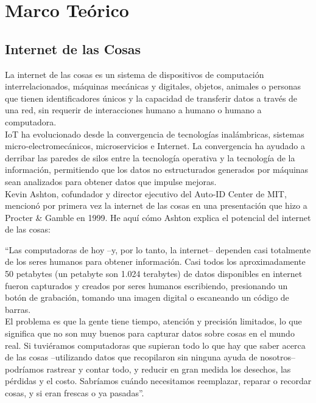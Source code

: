 \chapter{Marco Teórico}

\section{Internet de las Cosas}

La internet de las cosas es un sistema de dispositivos de computación interrelacionados, máquinas mecánicas y digitales, objetos, animales o personas que tienen identificadores únicos y la capacidad de transferir datos a través de una red, sin requerir de interacciones humano a humano o humano a computadora. \\

IoT ha evolucionado desde la convergencia de tecnologías inalámbricas, sistemas micro-electromecánicos, microservicios e Internet. La convergencia ha ayudado a derribar las paredes de silos entre la tecnología operativa  y la tecnología de la información, permitiendo que los datos no estructurados generados por máquinas sean analizados para obtener datos que impulse mejoras. \cite{TechT2017}\\

Kevin Ashton, cofundador y director ejecutivo del Auto-ID Center de MIT, mencionó por primera vez la internet de las cosas en una presentación que hizo a Procter \& Gamble en 1999. He aquí cómo Ashton explica el potencial del internet de las cosas:

``Las computadoras de hoy –y, por lo tanto, la internet– dependen casi totalmente de los seres humanos para obtener información. Casi todos los aproximadamente 50 petabytes (un petabyte son 1.024 terabytes) de datos disponibles en internet fueron capturados y creados por seres humanos escribiendo, presionando un botón de grabación, tomando una imagen digital o escaneando un código de barras. \\

El problema es que la gente tiene tiempo, atención y precisión limitados, lo que significa que no son muy buenos para capturar datos sobre cosas en el mundo real. Si tuviéramos computadoras que supieran todo lo que hay que saber acerca de las cosas –utilizando datos que recopilaron sin ninguna ayuda de nosotros– podríamos rastrear y contar todo, y reducir en gran medida los desechos, las pérdidas y el costo. Sabríamos cuándo necesitamos reemplazar, reparar o recordar cosas, y si eran frescas o ya pasadas”. \cite{Asthon2009}

